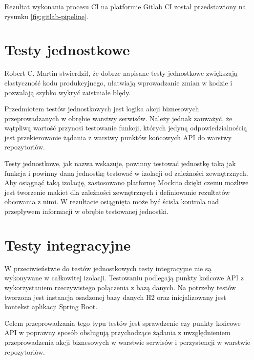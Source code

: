 \par
Rezultat wykonania procesu CI na platformie Gitlab CI został przedstawiony na rysunku \ref{fig:gitlab-pipeline}.


\section{Testy jednostkowe}

Robert C. Martin stwierdził, że dobrze napisane testy jednostkowe zwiększają elastyczność kodu produkcyjnego,
ułatwiają wprowadzanie zmian w kodzie i pozwalają szybko wykryć zaistniałe błędy\cite{book:czysty-kod}.

\par
Przedmiotem testów jednostkowych jest logika akcji biznesowych przeprowadzanych w obrębie warstwy serwisów.
Należy jednak zauważyć, że wątpliwą wartość przynosi testowanie funkcji,
których jedyną odpowiedzialnością jest przekierowanie żądania z warstwy punktów końcowych API do warstwy repozytoriów.

\par
Testy jednostkowe, jak nazwa wskazuje, powinny testować jednostkę taką jak funkcja i powinny daną jednostkę testować w izolacji od zależności zewnętrznych\cite{book:testy-jednostkowe}.
Aby osiągnąć taką izolację, zastosowano platformę Mockito dzięki czemu możliwe jest tworzenie makiet dla zależności zewnętrznych i definiowanie rezultatów obcowania z nimi.
W rezultacie osiągnięta może być ścisła kontrola nad przepływem informacji w obrębie testowanej jednostki.


\section{Testy integracyjne}

W przeciwieństwie do testów jednostkowych testy integracyjne nie są wykonywane w całkowitej izolacji\cite{book:testy-jednostkowe}.
Testowaniu podlegają punkty końcowe API z wykorzystaniem rzeczywistego połączenia z bazą danych.
Na potrzeby testów tworzona jest instancja osadzonej bazy danych H2\cite{tech:h2-db} oraz inicjalizowany jest kontekst aplikacji Spring Boot.

\par
Celem przeprowadzania tego typu testów jest sprawdzenie czy punkty końcowe API w poprawny sposób obsługują przychodzące żądania
z uwzględnieniem przeprowadzenia akcji biznesowych w warstwie serwisów i perzystencji w warstwie repozytoriów.

